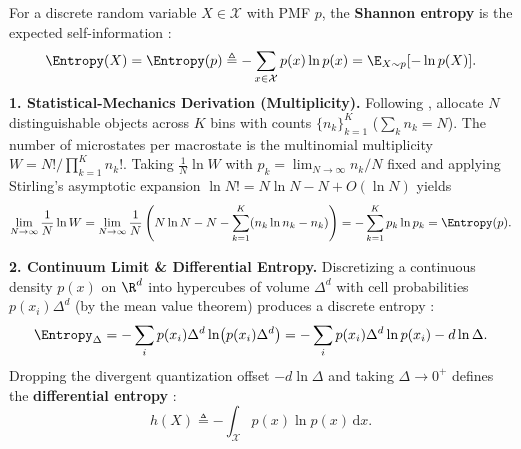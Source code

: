 \documentclass[../../../../master.tex]{subfiles}
\begin{document}
\begin{coremath}
\label{cm:infotheory:entropy}
For a discrete random variable $X \in \mathcal{X}$ with PMF $p$, the \textbf{Shannon entropy} is the expected self-information :
\begin{equation}
\label{eq:infotheory:shannon}
  \Entropy(X) = \Entropy(p) \triangleq -\sum_{x \in \mathcal{X}} p(x) \ln p(x) = \E_{X \sim p}[-\ln p(X)].
\end{equation}
\textbf{1. Statistical-Mechanics Derivation (Multiplicity).} Following , allocate $N$ distinguishable objects across $K$ bins with counts $\{n_k\}_{k=1}^K$ ($\sum_k n_k = N$). The number of microstates per macrostate is the multinomial multiplicity $W = N! / \prod_{k=1}^K n_k!$. Taking $\frac{1}{N}\ln W$ with $p_k = \lim_{N\to\infty} n_k / N$ fixed and applying Stirling's asymptotic expansion $\ln N! = N\ln N - N + O(\ln N)$ yields
\begin{equation}
\label{eq:infotheory:stirling}
  \lim_{N\to\infty} \frac{1}{N} \ln W
  = \lim_{N\to\infty} \frac{1}{N}\left(N\ln N - N - \sum_{k=1}^K (n_k\ln n_k - n_k)\right)
  = -\sum_{k=1}^K p_k \ln p_k = \Entropy(p).
\end{equation}

\textbf{2. Continuum Limit \& Differential Entropy.} Discretizing a continuous density $p(x)$ on $\R^d$ into hypercubes of volume $\Delta^d$ with cell probabilities $p(x_i)\Delta^d$ (by the mean value theorem) produces a discrete entropy :
\begin{equation}
\label{eq:infotheory:quantized_entropy}
  \Entropy_\Delta = -\sum_i p(x_i)\Delta^d \ln\bigl(p(x_i)\Delta^d\bigr)
  = -\sum_i p(x_i)\Delta^d \ln p(x_i) - d\ln\Delta.
\end{equation}
Dropping the divergent quantization offset $-d\ln\Delta$ and taking $\Delta \to 0^+$ defines the \textbf{differential entropy} :
\begin{equation}
\label{eq:infotheory:diff_entropy}
  h(X) \triangleq -\int_{\mathcal{X}} p(x) \ln p(x)\, \mathrm{d}x.
\end{equation}


\end{coremath}
\end{document}
